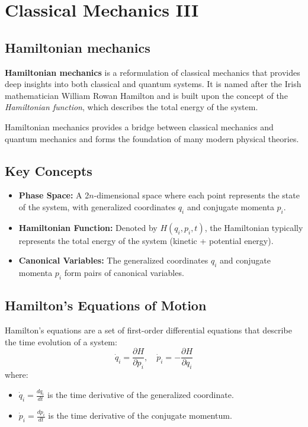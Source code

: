 \chapter{Classical Mechanics III}

\section{Hamiltonian mechanics}
\textbf{Hamiltonian mechanics} is a reformulation of classical mechanics that provides deep insights into both classical and quantum systems. It is named after the Irish mathematician William Rowan Hamilton and is built upon the concept of the \textit{Hamiltonian function}, which describes the total energy of the system.

Hamiltonian mechanics provides a bridge between classical mechanics and quantum mechanics and forms the foundation of many modern physical theories.

\section{Key Concepts}
\begin{itemize}
    \item \textbf{Phase Space:} A 2$n$-dimensional space where each point represents the state of the system, with generalized coordinates $q_i$ and conjugate momenta $p_i$.
    \item \textbf{Hamiltonian Function:} Denoted by $H(q_i, p_i, t)$, the Hamiltonian typically represents the total energy of the system (kinetic + potential energy).
    \item \textbf{Canonical Variables:} The generalized coordinates $q_i$ and conjugate momenta $p_i$ form pairs of canonical variables.
\end{itemize}

\section{Hamilton's Equations of Motion}
Hamilton's equations are a set of first-order differential equations that describe the time evolution of a system:
\[
\dot{q}_i = \frac{\partial H}{\partial p_i}, \quad \dot{p}_i = -\frac{\partial H}{\partial q_i}
\]
where:
\begin{itemize}
    \item $\dot{q}_i = \frac{dq_i}{dt}$ is the time derivative of the generalized coordinate.
    \item $\dot{p}_i = \frac{dp_i}{dt}$ is the time derivative of the conjugate momentum.
\end{itemize}

